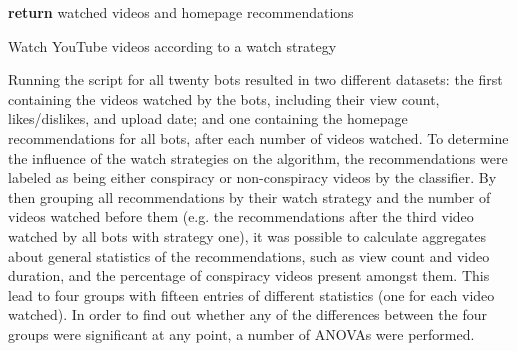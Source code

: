 \documentclass[../main.tex]{subfiles}
\begin{document}
\vspace{0.25in}

\nolinenumbers

\begin{algorithm}[H]
 
 \vspace{0.075in}

 \vspace{0.05in}
 \textbf{return} watched videos and homepage recommendations\;
 \caption{Watch YouTube videos according to a watch strategy}
\end{algorithm}

\vspace{0.25in}

\linenumbers

\noindent Running the script for all twenty bots resulted in two different datasets: the first containing
the videos watched by the bots, including their view count, likes/dislikes, and upload date; and one 
containing the homepage recommendations for all bots, after each number of videos watched.
To determine the influence of the watch strategies on the algorithm, the recommendations were labeled as 
being either conspiracy or non-conspiracy videos by the classifier. By then grouping all recommendations 
by their watch strategy and the number of videos watched before them (e.g. the recommendations after the 
third video watched by all bots with strategy one), it was possible to calculate aggregates about general
statistics of the recommendations, such as view count and video duration, and the percentage of 
conspiracy videos present amongst them. This lead to four groups with fifteen entries of different 
statistics (one for each video watched). In order to find out whether any of the differences between the 
four groups were significant at any point, a number of ANOVAs were performed. 
\end{document}
